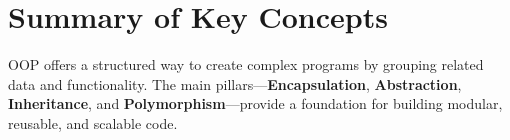 \documentclass{article}
\begin{document}
\section{Summary of Key Concepts}
OOP offers a structured way to create complex programs by grouping related data and functionality. The main pillars—\textbf{Encapsulation}, \textbf{Abstraction}, \textbf{Inheritance}, and \textbf{Polymorphism}—provide a foundation for building modular, reusable, and scalable code.
\end{document}
